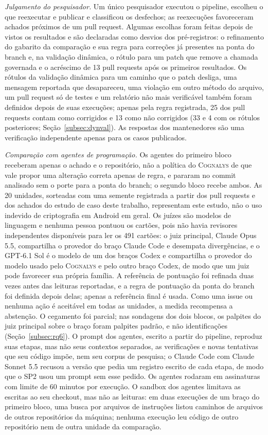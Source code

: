 \documentclass[conference]{IEEEtran}
\newcommand{\system}{\textsc{Cognalys}}
\begin{document}
\emph{Julgamento do pesquisador.} Um único pesquisador executou o pipeline, escolheu o que
reexecutar e publicar e classificou os desfechos; as reexecuções favoreceram achados
próximos de um pull request. Algumas escolhas foram feitas depois de vistos os resultados
e são declaradas como desvios dos pré-registros: o refinamento do gabarito da comparação
e sua regra para correções já presentes na ponta do branch e, na validação
dinâmica, o rótulo para um patch que remove a chamada governada e o acréscimo
de 13 pull requests após os primeiros resultados. Os rótulos da validação dinâmica para um
caminho que o patch desliga, uma mensagem reportada que desapareceu, uma violação em
outro método do arquivo, um pull request só de testes e um relatório não mais
verificável também foram definidos depois de suas execuções; apenas pela regra registrada, 25 dos pull requests
contam como corrigidos e 13 como não corrigidos (33 e 4 com os rótulos posteriores;
Seção~\ref{subsec:dynval}). As respostas dos mantenedores são uma
verificação independente apenas para os casos publicados.

\emph{Comparação com agentes de programação.} Os agentes do primeiro bloco receberam apenas
o achado e o repositório, não a política do \system{} de que vale propor uma alteração
correta apenas de regra, e pararam no commit analisado
sem o porte para a ponta do branch; o segundo bloco recebe ambos. As 20 unidades, sorteadas com uma
semente registrada a partir dos pull requests e dos achados do estudo de caso deste trabalho,
representam este estudo, não o uso indevido de criptografia em Android em geral. Os
juízes são modelos de linguagem e nenhuma pessoa pontuou os cartões, pois
não havia revisores independentes disponíveis para ler os 491 cartões: o juiz
principal, Claude Opus 5.5, compartilha o provedor do braço Claude Code e desempata
divergências, e o GPT-6.1 Sol é o modelo de um dos braços Codex e compartilha o
provedor do modelo usado pelo \system{} e pelo outro braço Codex, de modo que um juiz pode
favorecer sua própria família. A referência de pontuação foi refinada duas vezes antes das
leituras reportadas, e a regra de pontuação da ponta do branch foi definida depois delas; apenas a
referência final é usada. Como uma issue ou nenhuma ação é aceitável em todas as
unidades, a medida recompensa a abstenção. O cegamento foi parcial; nas sondagens dos dois blocos, os
palpites do juiz principal sobre o braço foram palpites padrão, e não
identificações (Seção~\ref{subsec:rq6}). O prompt dos agentes, escrito a partir do pipeline, reproduz suas
etapas, mas não seus contextos separados, as verificações e novas tentativas que seu código
impõe, nem seu corpus de pesquisa; o Claude Code com Claude Sonnet 5.5 recusou
a versão que pedia um registro escrito de cada etapa, de modo que o SP2 usou um
prompt sem esse pedido. Os agentes rodaram em assinaturas com limite de 60 minutos
por execução. O sandbox dos agentes limitava as escritas ao seu checkout, mas não as
leituras: em duas execuções de um braço do primeiro bloco, uma busca por arquivos de
instruções listou caminhos de arquivos de outros repositórios da máquina; nenhuma
execução leu código de outro repositório nem de outra unidade da comparação.
\end{document}
